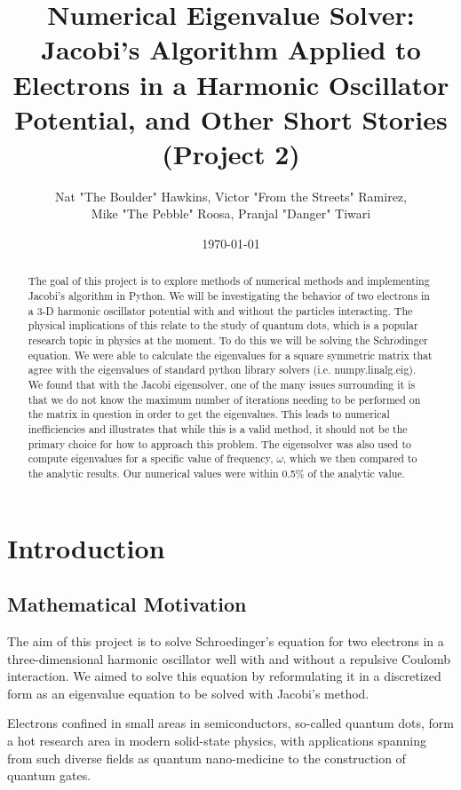 \documentclass{article}
\title{Numerical Eigenvalue Solver: \\Jacobi's Algorithm Applied to Electrons in a Harmonic Oscillator Potential, and Other Short Stories \smiley\\(Project 2)}
\author{Nat "The Boulder" Hawkins, Victor "From the Streets" Ramirez,\\ Mike "The Pebble" Roosa, Pranjal "Danger" Tiwari}
\date{\today}
\begin{document}
\maketitle
\noindent
\begin{abstract}
	The goal of this project is to explore methods of numerical methods and implementing Jacobi's algorithm in Python. We will be investigating the behavior of two electrons in a 3-D harmonic oscillator potential with and without the particles interacting. The physical implications of this relate to the study of quantum dots, which is a popular research topic in physics at the moment. To do this we will be solving the Schr$\ddot{o}$dinger equation. We were able to calculate the eigenvalues for a square symmetric matrix that agree with the eigenvalues of standard python library solvers (i.e. numpy.linalg.eig). We found that with the Jacobi eigensolver, one of the many issues surrounding it is that we do not know the maximum number of iterations needing to be performed on the matrix in question in order to get the eigenvalues. This leads to numerical inefficiencies and illustrates that while this is a valid method, it should not be the primary choice for how to approach this problem. The eigensolver was also used to compute eigenvalues for a specific value of frequency, $\omega$, which we then compared to the analytic results. Our numerical values were within 0.5\% of the analytic value. 
	
\end{abstract}

\newpage

\section{Introduction}

\subsection{Mathematical Motivation}

The aim of this project is to solve Schroedinger's equation for two
electrons in a three-dimensional harmonic oscillator well with and
without a repulsive Coulomb interaction.  We aimed to solve this
equation by reformulating it in a discretized form as an eigenvalue
equation to be solved with Jacobi's method. 

Electrons confined in small areas in semiconductors, so-called quantum
dots, form a hot research area in modern solid-state physics, with
applications spanning from such diverse fields as quantum
nano-medicine to the construction of quantum gates. 
\end{document}

